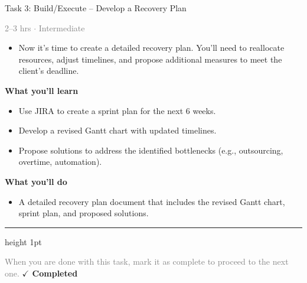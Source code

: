 \documentclass[10pt,a4paper]{article}
\begin{document}
\begin{taskbox}{Task 3: Build/Execute – Develop a Recovery Plan}

    {\small \textcolor{gray}{2--3 hrs $\cdot$ Intermediate}}\\[12pt]

\begin{itemize}
    \item Now it’s time to create a detailed recovery plan. You’ll need to reallocate resources, adjust timelines, and propose additional measures to meet the client’s deadline.

\end{itemize}
\vspace{8pt}
{\large \textbf{\textcolor{brandLight}{What you'll learn}}}\\[4pt] 
\begin{itemize}
    \item Use JIRA to create a sprint plan for the next 6 weeks.
    \item Develop a revised Gantt chart with updated timelines.
    \item Propose solutions to address the identified bottlenecks (e.g., outsourcing, overtime, automation).

\end{itemize}
{\large \textbf{\textcolor{brandLight}{What you'll do}}}\\[4pt] 
\begin{itemize}
    \item A detailed recovery plan document that includes the revised Gantt chart, sprint plan, and proposed solutions.\par
\end{itemize}

    \vspace{16pt}

    \textcolor{cardBorder}{\hrule height 1pt}\vspace{8pt}

    \small \textcolor{gray}{When you are done with this task, mark it as complete to proceed to the next one.} \hfill \textbf{\textcolor{brandDark}{$\checkmark$ Completed}}

\end{taskbox}
\end{document}
